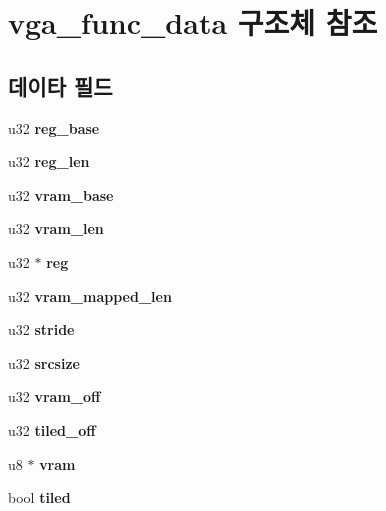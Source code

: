 \section{vga\-\_\-func\-\_\-data 구조체 참조}
\label{structvga__func__data}
\subsection*{데이타 필드}
\begin{DoxyCompactItemize}
\item 
u32 {\bfseries reg\-\_\-base}\label{structvga__func__data_a0febb150c9e33c3d3d499d16f2c25aa2}

\item 
u32 {\bfseries reg\-\_\-len}\label{structvga__func__data_ad1fa2e8138bd8018a80cc916c521d120}

\item 
u32 {\bfseries vram\-\_\-base}\label{structvga__func__data_a7bf3c6a7824f12bb8d9aaf6a584ed0e6}

\item 
u32 {\bfseries vram\-\_\-len}\label{structvga__func__data_a8589ff2602ba59454489d15660f8856d}

\item 
u32 $\ast$ {\bfseries reg}\label{structvga__func__data_a5b8980041d3aa45da13690d3e87dd6ed}

\item 
u32 {\bfseries vram\-\_\-mapped\-\_\-len}\label{structvga__func__data_ad05a484f45fa3860b4f5db2b153ca726}

\item 
u32 {\bfseries stride}\label{structvga__func__data_ae1b1ebde16b53679229b9ff5848c1d4a}

\item 
u32 {\bfseries srcsize}\label{structvga__func__data_aa53e45766d56256b86a2f6fdfa66e527}

\item 
u32 {\bfseries vram\-\_\-off}\label{structvga__func__data_a1ae4aa2e42f550832b7a527722592c41}

\item 
u32 {\bfseries tiled\-\_\-off}\label{structvga__func__data_ad02f467319387e293b85b17fc5f0f530}

\item 
u8 $\ast$ {\bfseries vram}\label{structvga__func__data_a17e12fcf88e50abfa39d19d2e0e7556d}

\item 
bool {\bfseries tiled}\label{structvga__func__data_ab71a96007b07c910d86cd2d6a4b002ef}


\end{DoxyCompactItemize}
